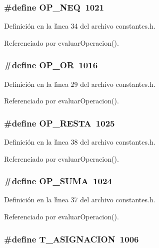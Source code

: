 \subsubsection{\setlength{\rightskip}{0pt plus 5cm}\#define OP\_\-NEQ~1021}\label{constantes_8h_a23}




Definici\'{o}n en la l\'{\i}nea 34 del archivo constantes.h.

Referenciado por evaluar\-Operacion().
\subsubsection{\setlength{\rightskip}{0pt plus 5cm}\#define OP\_\-OR~1016}\label{constantes_8h_a18}




Definici\'{o}n en la l\'{\i}nea 29 del archivo constantes.h.

Referenciado por evaluar\-Operacion().
\subsubsection{\setlength{\rightskip}{0pt plus 5cm}\#define OP\_\-RESTA~1025}\label{constantes_8h_a27}




Definici\'{o}n en la l\'{\i}nea 38 del archivo constantes.h.

Referenciado por evaluar\-Operacion().
\subsubsection{\setlength{\rightskip}{0pt plus 5cm}\#define OP\_\-SUMA~1024}\label{constantes_8h_a26}




Definici\'{o}n en la l\'{\i}nea 37 del archivo constantes.h.

Referenciado por evaluar\-Operacion().
\subsubsection{\setlength{\rightskip}{0pt plus 5cm}\#define T\_\-ASIGNACION~1006}\label{constantes_8h_a9}




